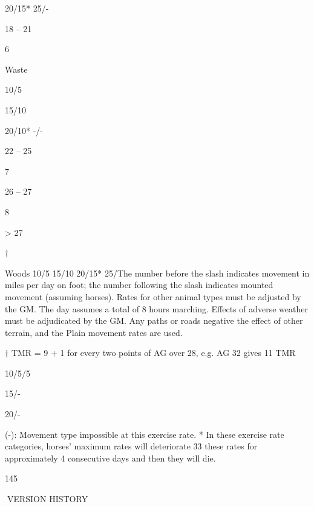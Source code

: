 \documentclass[a4paper]{article}
\begin{document}
\begin{multicols}{3}
20/15* 25/-

18 – 21

6

Waste

10/5

15/10

20/10* -/-

22 – 25

7

26 – 27

8

> 27

†

Woods
10/5 15/10
20/15* 25/The number before the slash indicates movement in miles per day on foot; the number following the slash
indicates mounted movement (assuming horses). Rates for other animal types must be adjusted by the GM.
The day assumes a total of 8 hours marching. Effects of adverse weather must be adjudicated by the GM.
Any paths or roads negative the effect of other terrain, and the Plain movement rates are used.

† TMR = 9 + 1 for every two points of AG over
28, e.g. AG 32 gives 11 TMR

10/5/5

15/-

20/-

(-): Movement type impossible at this exercise rate.
* In these exercise rate categories, horses’ maximum rates will deteriorate 33%
these rates for approximately 4 consecutive days and then they will die.

145

VERSION HISTORY


\end{multicols}
\end{document}
